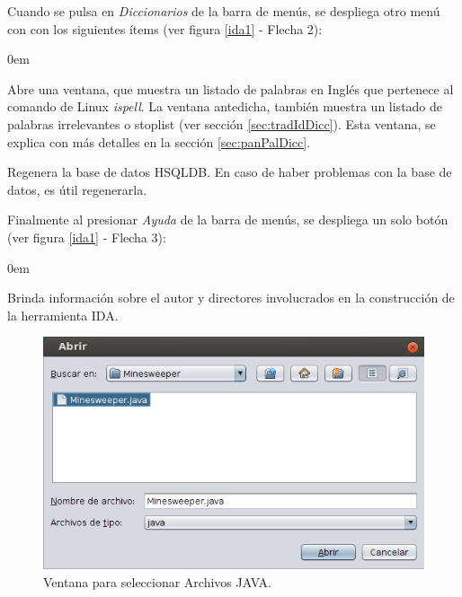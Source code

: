 Cuando se pulsa en \textit{Diccionarios} de la barra de menús, se despliega otro menú con con los siguientes ítems (ver figura \ref{ida1} - Flecha 2):

\begin{description}
\itemsep0em%

\item[Ver Diccionarios:] Abre una ventana, que muestra un listado de palabras en Inglés que pertenece al comando de Linux \textit{ispell}. %
La ventana antedicha, también muestra un listado de palabras irrelevantes o stoplist (ver sección \ref{sec:tradIdDicc}). Esta ventana, se explica con más detalles en la sección \ref{sec:panPalDicc}.

\item[Restablecer B.D.(Base de Datos):] Regenera la base de datos HSQLDB. En caso de haber problemas con la base de datos, es útil regenerarla.

\end{description}

Finalmente al presionar \textit{Ayuda} de la barra de menús, se despliega un solo botón (ver figura \ref{ida1} - Flecha 3):

\begin{description}
\itemsep0em%
\item[Acerca de:] Brinda información sobre el autor y directores involucrados en la construcción de la herramienta IDA.
\end{description}

\begin{figure}[t] %
\centerline{%
\includegraphics[scale= 0.7]{./cap4/ida_02.png}
}
\caption{Ventana para seleccionar Archivos JAVA.}
\label{ida2}
\end{figure}


